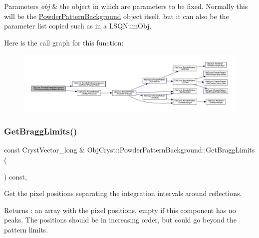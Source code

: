\begin{DoxyParams}{Parameters}
{\em obj} & the object in which are parameters to be fixed. Normally this will be the \mbox{\hyperlink{class_obj_cryst_1_1_powder_pattern_background}{Powder\+Pattern\+Background}} object itself, but it can also be the parameter list copied such as in a L\+S\+Q\+Num\+Obj. \\
\hline
\end{DoxyParams}
Here is the call graph for this function\+:
\nopagebreak
\begin{figure}[H]
\begin{center}
\leavevmode
\includegraphics[width=350pt]{class_obj_cryst_1_1_powder_pattern_background_a874e0bed05f17df53ad6ddd3df989dc9_cgraph}
\end{center}
\end{figure}
\mbox{\label{class_obj_cryst_1_1_powder_pattern_background_ae75d135c8faa3aa4e0d7e145d848e8a1}} 
\subsubsection{\texorpdfstring{GetBraggLimits()}{GetBraggLimits()}}
{\footnotesize\ttfamily const Cryst\+Vector\+\_\+long \& Obj\+Cryst\+::\+Powder\+Pattern\+Background\+::\+Get\+Bragg\+Limits (\begin{DoxyParamCaption}{ }\end{DoxyParamCaption}) const\hspace{0.3cm}{\ttfamily [protected]}, {\ttfamily [virtual]}}

Get the pixel positions separating the integration intervals around reflections.

\begin{DoxyReturn}{Returns}
\+: an array with the pixel positions, empty if this component has no peaks. The positions should be in increasing order, but could go beyond the pattern limits. 
\end{DoxyReturn}


